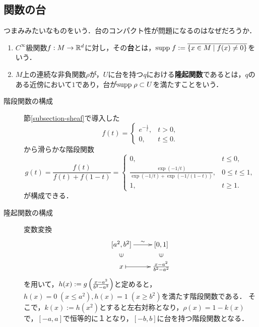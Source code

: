 \documentclass[uplatex,dvipdfmx]{jsreport}
\begin{document}
\subsection{関数の台}

\begin{tcolorbox}[colframe=ForestGreen, colback=ForestGreen!10!white,breakable,colbacktitle=ForestGreen!40!white,coltitle=black,fonttitle=\bfseries\sffamily,
title=]
    つまみみたいなものをいう．台のコンパクト性が問題になるのはなぜだろうか．
\end{tcolorbox}

\begin{definition}\mbox{}
    \begin{enumerate}
        \item $C^\infty$級関数$f:M\to\mathbb{R}^d$に対し，その\textbf{台}とは，$\mathrm{supp}\; f:=\overline{\{x\in M\mid f(x)\ne 0\}}$をいう．
        \item $M$上の連続な非負関数$\rho$が，$U$に台を持つ$q$における\textbf{隆起関数}であるとは，$q$のある近傍において$1$であり，台が$\mathrm{supp}\;\rho\subset U$を満たすことをいう．
    \end{enumerate}
\end{definition}

\begin{example}\mbox{}
    \begin{description}
        \item[階段関数の構成] 
    節\ref{subsection-sheaf}で導入した
    \[f(t)=\begin{cases}
        e^{-\frac{1}{t}},&t>0,\\
        0,&t\le 0.
    \end{cases}\]
    から滑らかな階段関数
    \[g(t)=\frac{f(t)}{f(t)+f(1-t)}=\begin{cases}
        0,&t\le 0,\\
        \frac{\exp(-1/t)}{\exp(-1/t)+\exp(-1/(1-t))},&0\le t\le 1,\\
        1,&t\ge 1.
    \end{cases}\]
    が構成できる．
        \item[隆起関数の構成]
        変数変換
        \[\xymatrix@R-2pc{
            [a^2,b^2]\ar[r]^-\sim&[0,1]\\
            \rotatebox[origin=c]{90}{$\in$}&\rotatebox[origin=c]{90}{$\in$}\\
            x\ar@{|->}[r]&\frac{x-a^2}{b^2-a^2}
        }\]
        を用いて，$h(x):=g\left(\frac{x-a^2}{b^2-a^2}\right)$と定めると，$h(x)=0\;(x\le a^2),h(x)=1\;(x\ge b^2)$を満たす階段関数である．
        そこで，$k(x):=h(x^2)$とすると左右対称となり，$\rho(x)=1-k(x)$で，$[-a,a]$で恒等的に１となり，$[-b,b]$に台を持つ階段関数となる．
    \end{description}
\end{example}
\end{document}
